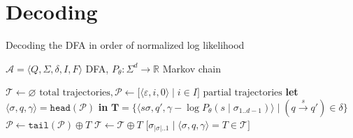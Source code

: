 \documentclass{beamer}
\begin{document}
\section{Decoding}\label{sec:error-correction}

\begin{frame}[fragile]{Decoding the DFA in order of normalized log likelihood}
\vspace{-0.3cm}
\begin{algorithm}[H]
\caption{Steerable DFA walk}
\label{alg:adaptive}
\begin{algorithmic}[1]
\Require $\mathcal{A} = \langle Q, \Sigma, \delta, I, F\rangle$ DFA, $P_\theta: \Sigma^d \rightarrow \mathbb{R}$ Markov chain

\State $\mathcal{T} \gets \varnothing \text{ total trajectories}, \mathcal{P} \gets \big[\langle \varepsilon, i, 0\rangle \mid i \in I\big] \text{ partial trajectories}$
\Repeat
\State \textbf{let }$\langle \sigma, q, \gamma \rangle = \texttt{head}(\mathcal{P})$ \textbf{in}
\State {}$\mathbf{T} = \big\{\langle s\sigma, q', \gamma - \log P_\theta(s \mid \sigma_{1..d-1}) \rangle\mid (q\overset{s}{\rightarrow}q') \in \delta\big\}$
\State $\mathcal{P} \gets \texttt{tail}(\mathcal{P}) \oplus T$ 
\EndIf
{}
\State $\mathcal{T} \gets \mathcal{T} \oplus T$ 
\EndIf
\EndFor
{}
\State \Return $\big[\sigma_{|\sigma|..1} \mid \langle \sigma, q, \gamma \rangle = T \in \mathcal{T}\big]$ 
\end{algorithmic}
\end{algorithm}
\end{frame}
\end{document}
